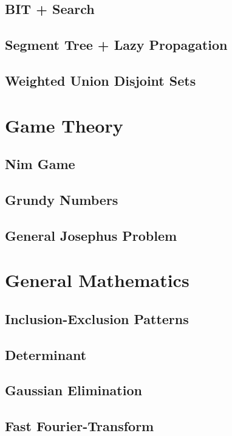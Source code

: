 		\subsection{BIT + Search}
			
		\subsection{Segment Tree + Lazy Propagation}
			
		\subsection{Weighted Union Disjoint Sets}
			
	\section{Game Theory}
		\subsection{Nim Game}
			
		\subsection{Grundy Numbers}
			
		\subsection{General Josephus Problem}
	\section{General Mathematics}
		\subsection{Inclusion-Exclusion Patterns}
			
		\subsection{Determinant}
			
		\subsection{Gaussian Elimination}
			
		\subsection{Fast Fourier-Transform}
			
